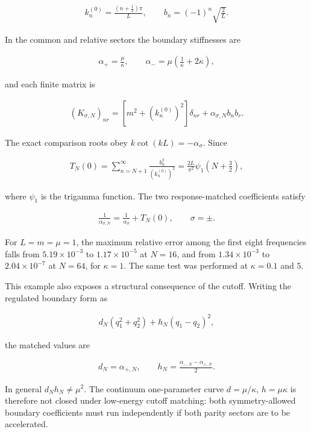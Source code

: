 \begin{align}
k_n^{(0)}=\frac{(n+\frac12)\pi}{L},
\qquad
b_n=(-1)^n\sqrt{\frac2L}.
\end{align}

In the common and relative sectors the boundary stiffnesses are

\begin{align}
\alpha_+=\frac\mu\kappa,
\qquad
\alpha_-=\mu\left(\frac1\kappa+2\kappa\right),
\end{align}

and each finite matrix is

\begin{align}
(K_{\sigma,N})_{nr}
=\left[m^2+(k_n^{(0)})^2\right]\delta_{nr}
+\alpha_{\sigma,N}b_nb_r.
\end{align}

The exact comparison roots obey $k\cot(kL)=-\alpha_\sigma$. Since

\begin{align}
T_N(0)
=\sum_{n=N+1}^{\infty}\frac{b_n^2}{(k_n^{(0)})^2}
=\frac{2L}{\pi^2}\psi_1\!\left(N+\frac32\right),
\end{align}

where $\psi_1$ is the trigamma function. The two response-matched coefficients satisfy

\begin{align}
\frac1{\alpha_{\sigma,N}}
=\frac1{\alpha_\sigma}+T_N(0),
\qquad \sigma=\pm.
\end{align}

For $L=m=\mu=1$, the maximum relative error among the first eight frequencies falls from $5.19\times10^{-3}$ to $1.17\times10^{-5}$ at $N=16$, and from $1.34\times10^{-3}$ to $2.04\times10^{-7}$ at $N=64$, for $\kappa=1$. The same test was performed at $\kappa=0.1$ and $5$.

This example also exposes a structural consequence of the cutoff. Writing the regulated boundary form as

\begin{align}
d_N(q_1^2+q_2^2)+h_N(q_1-q_2)^2,
\end{align}

the matched values are

\begin{align}
d_N=\alpha_{+,N},
\qquad
h_N=\frac{\alpha_{-,N}-\alpha_{+,N}}2.
\end{align}

In general $d_Nh_N\neq\mu^2$. The continuum one-parameter curve $d=\mu/\kappa$, $h=\mu\kappa$ is therefore not closed under low-energy cutoff matching: both symmetry-allowed boundary coefficients must run independently if both parity sectors are to be accelerated.

